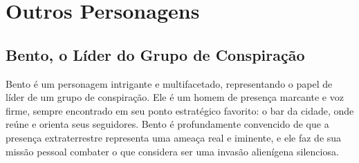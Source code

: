\chapter{Outros Personagens}

\section{Bento, o Líder do Grupo de Conspiração}

Bento é um personagem intrigante e multifacetado, representando o papel de líder de um grupo de conspiração. Ele é um homem de presença marcante e voz firme, sempre encontrado em seu ponto estratégico favorito: o bar da cidade, onde reúne e orienta seus seguidores. Bento é profundamente convencido de que a presença extraterrestre representa uma ameaça real e iminente, e ele faz de sua missão pessoal combater o que considera ser uma invasão alienígena silenciosa.

